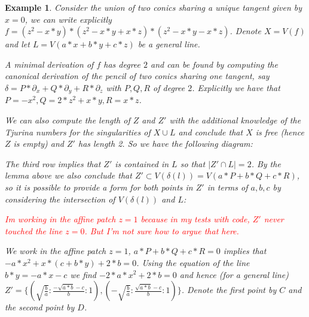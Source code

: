\documentclass{article}
\newtheorem{example}{Example}[section]
\begin{document}
\begin{example}
    Consider the union of two conics sharing a unique tangent given by $x = 0$, we can write explicitly $f = (z^2-x*y)*(z^2-x*y+x*z)*(z^2-x*y-x*z)$. Denote $X = V(f)$ and let $L = V(a*x+b*y+c*z)$ be a general line.

    A minimal derivation of $f$ has degree $2$ and can be found by computing the canonical derivation of the pencil of two conics sharing one tangent, say $\delta = P*\partial_x + Q*\partial_y + R*\partial_z$ with $P,Q,R$ of degree $2$. Explicitly we have that $P = -x^2, Q = 2*z^2+x*y, R = x*z$.

    We can also compute the length of $Z$ and $Z'$ with the additional knowledge of the Tjurina numbers for the singularities of $X \cup L$ and conclude that $X$ is free (hence $Z$ is empty) and $Z'$ has length 2. So we have the following diagram:
    \begin{center}
    \end{center}
The third row implies that $Z'$ is contained in $L$ so that $|Z' \cap L| = 2$. By the lemma above we also conclude that $Z' \subset V(\delta(l)) = V(a*P+b*Q+c*R)$, so it is possible to provide a form for both points in $Z'$ in terms of $a,b,c$ by considering the intersection of $V(\delta(l))$ and $L$:

\textcolor{red}{Im working in the affine patch $z=1$ because in my tests with code, $Z'$ never touched the line $z=0$. But I'm not sure how to argue that here.}

We work in the affine patch $z=1$, $a*P + b*Q + c*R = 0$ implies that $-a*x^2+x*(c+b*y)+2*b = 0$. Using the equation of the line $b*y=-a*x-c$ we find $-2*a*x^2+2*b=0$ and hence (for a general line) $Z' = \{(\sqrt{\frac{b}{a}}:\frac{-\sqrt{a*b}-c}{b}:1),(-\sqrt{\frac{b}{a}}:\frac{\sqrt{a*b}-c}{b}:1)\}$. Denote the first point by $C$ and the second point by $D$.


\end{example}
\end{document}
